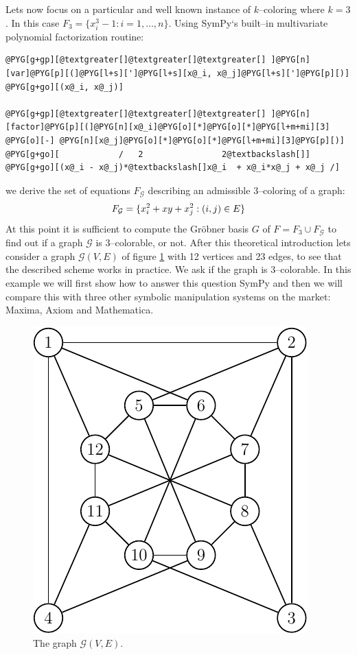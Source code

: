 Lets now focus on a particular and well known instance of $k$--coloring where $k = 3$. In this
case $F_3 = \{ x_i^3 - 1 : i = 1, \ldots, n \}$. Using SymPy`s built--in multivariate polynomial
factorization routine:

\begin{Verbatim}[commandchars=@\[\]]
@PYG[g+gp][@textgreater[]@textgreater[]@textgreater[] ]@PYG[n][var]@PYG[p][(]@PYG[l+s][']@PYG[l+s][x@_i, x@_j]@PYG[l+s][']@PYG[p][)]
@PYG[g+go][(x@_i, x@_j)]

@PYG[g+gp][@textgreater[]@textgreater[]@textgreater[] ]@PYG[n][factor]@PYG[p][(]@PYG[n][x@_i]@PYG[o][*]@PYG[o][*]@PYG[l+m+mi][3] @PYG[o][-] @PYG[n][x@_j]@PYG[o][*]@PYG[o][*]@PYG[l+m+mi][3]@PYG[p][)]
@PYG[g+go][            /   2                2@textbackslash[]]
@PYG[g+go][(x@_i - x@_j)*@textbackslash[]x@_i  + x@_i*x@_j + x@_j /]
\end{Verbatim}
\noindent
we derive the set of equations $F_{\mathcal{G}}$ describing an admissible $3$--coloring of a graph:
\begin{gather}
\begin{split}F_{\mathcal{G}} = \{ x_i^2 + x y + x_j^2 : (i, j) \in E \}\end{split}\notag
\end{gather}
At this point it is sufficient to compute the Gröbner basis $G$ of $F = F_3 \cup F_{\mathcal{G}}$
to find out if a graph $\mathcal{G}$ is $3$--colorable, or not. After this theoretical introduction
lets consider a graph $\mathcal{G}(V, E)$ of figure \ref{fig-graph-nocolor} with 12 vertices and
23 edges, to see that the described scheme works in practice. We ask if the graph is $3$--colorable.
In this example we will first show how to answer this question SymPy and then we will compare this
with three other symbolic manipulation systems on the market: Maxima, Axiom and Mathematica.
\begin{figure}[htbp]
\centering

\includegraphics{graph-nocolor.pdf}
\caption{The graph $\mathcal{G}(V, E)$.\label{fig-graph-nocolor}}\end{figure}

